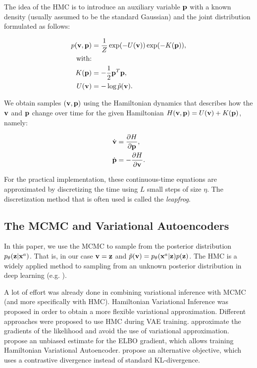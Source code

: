 The idea of the HMC is to introduce an auxiliary variable ${\mathbf{p}}$ with a known density (usually assumed to be the standard Gaussian) and the joint distribution formulated as follows: 

\begin{align}\label{eq:hmc}
p(\rvv, \rvp) &= \frac{1}{Z}\exp(-U(\rvv)) \exp(-K(\rvp)),   \\
\text{with:}& \notag\\
K(\rvp) &= - \frac{1}{2}\rvp^T\rvp, \\
U(\rvv) &= -\log \tilde{p}(\rvv). 
\end{align}

We obtain samples $({\mathbf{v}}, {\mathbf{p}})$ using the Hamiltonian dynamics \cite{neal2011mcmc} that describes how the ${\mathbf{v}}$ and ${\mathbf{p}}$ change over time for the given Hamiltonian $H({\mathbf{v}}, {\mathbf{p}}) = U({\mathbf{v}}) + K({\mathbf{p}})$, namely:

\begin{align}
\dot{{\mathbf{v}}} &= \frac{\partial H}{\partial {\mathbf{p}}},\\
\dot{{\mathbf{p}}} &= - \frac{\partial H}{\partial {\mathbf{v}}}.
\end{align}

For the practical implementation, these continuous-time equations are approximated by discretizing the time using $L$ small steps of size $\eta$. The discretization method that is often used is called the \textit{leapfrog}.

\subsection{The MCMC and Variational Autoencoders}
In this paper, we use the MCMC to sample from the posterior distribution $p_{\theta}({\mathbf{z}}|{\mathbf{x}}^a)$. That is, in our case ${\mathbf{v}} = {\mathbf{z}}$ and $ \tilde{p}({\mathbf{v}}) = p_{\theta}({\mathbf{x}}^a|{\mathbf{z}})p({\mathbf{z}})$. The HMC is a widely applied method to sampling from an unknown posterior distribution in deep learning (e.g. \cite{izmailov2021bayesian}). 

A lot of effort was already done in combining variational inference with MCMC (and more specifically with HMC). Hamiltonian Variational Inference \cite{salimans2015markov, wolf2016variational} was proposed in order to obtain a more flexible variational approximation. Different approaches were proposed to use HMC during VAE training. \cite{hoffman2017learning} approximate the gradients of the likelihood and avoid the use of variational approximation. \cite{caterini2018hamiltonian} propose an unbiased estimate for the ELBO gradient, which allows training Hamiltonian Variational Autoencoder. \cite{ruiz2019contrastive} propose an alternative objective, which uses a contrastive divergence instead of standard KL-divergence. 


